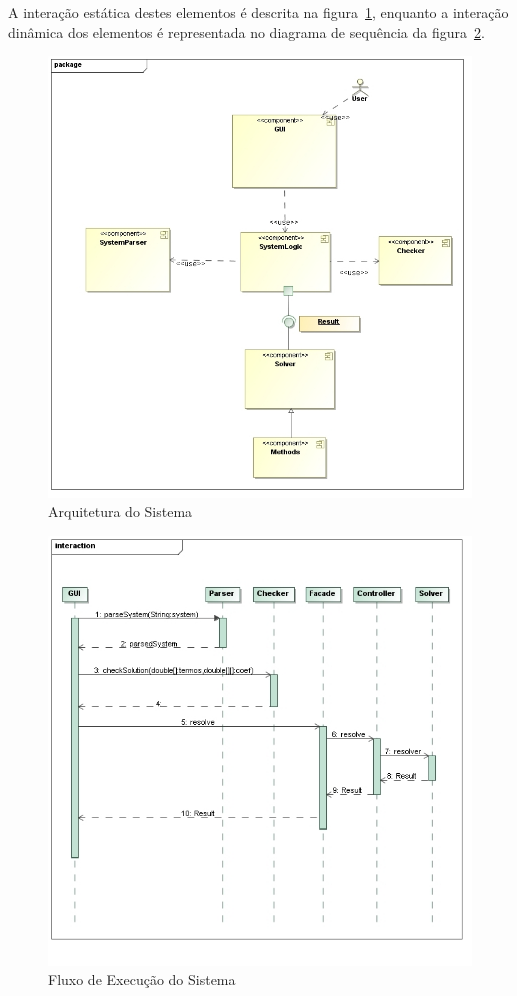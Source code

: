 \documentclass[a4paper,10pt]{report}
\begin{document}
A interação estática destes elementos é descrita na figura~\ref{fig:arquitetura}, enquanto a interação dinâmica dos elementos é representada no diagrama de sequência da figura~\ref{fig:fluxo}.

\begin{figure}
 \centering
 \includegraphics[width=\textwidth]{MSN1}
 \caption{Arquitetura do Sistema}
 \label{fig:arquitetura}
\end{figure}


\begin{figure}
 \centering
 \includegraphics[width=\textwidth]{MSNFlow}
 \caption{Fluxo de Execução do Sistema}
 \label{fig:fluxo}
\end{figure}
\end{document}
